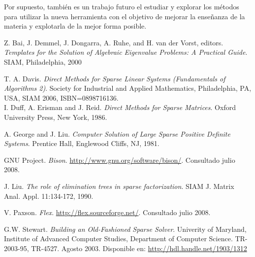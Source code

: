 \documentclass[a4paper,10pt]{article}
\begin{document}
Por supuesto, también es un trabajo futuro el estudiar y explorar los métodos para utilizar la nueva herramienta con el objetivo de mejorar la enseñanza de la materia y explotarla de la mejor forma posible.


\appendix

\begin{thebibliography}{99}

 Z. Bai, J. Demmel, J. Dongarra, A. Ruhe, and H. van der Vorst, editors. \textit{Templates for the Solution of Algebraic Eigenvalue Problems: A Practical Guide}. SIAM, Philadelphia, 2000

 T. A. Davis. \textit{Direct Methods for Sparse Linear Systems (Fundamentals of Algorithms 2)}.
Society for Industrial and Applied Mathematics, Philadelphia, PA, USA, SIAM 2006, ISBN=0898716136. \\

 I. Duff, A. Erisman and J. Reid.  \textit{Direct Methods for Sparse Matrices}. 
 Oxford University Press, New York, 1986. 

 A. George and J. Liu. 	\textit{Computer Solution of Large Sparse Positive Definite Systems}.
  Prentice Hall, Englewood Cliffs, NJ, 1981.

 GNU Project. \textit{Bison}. \url{http://www.gnu.org/software/bison/}. Consultado julio 2008.

   J. Liu. \textit{ The role of elimination trees in sparse factorization}.
 SIAM J. Matrix Anal. Appl. 11:134-172, 1990. 

 V. Paxson. \textit{Flex}. \url{http://flex.sourceforge.net/}. Consultado julio 2008.

 G.W. Stewart. \textit{Building an Old-Fashioned Sparse Solver}.
Univerity of Maryland, Institute of Advanced Computer Studies, Department of Computer Science.
TR-2003-95, TR-4527. Agosto 2003. Disponible en: \url{http://hdl.handle.net/1903/1312}


\end{thebibliography}
\end{document}
